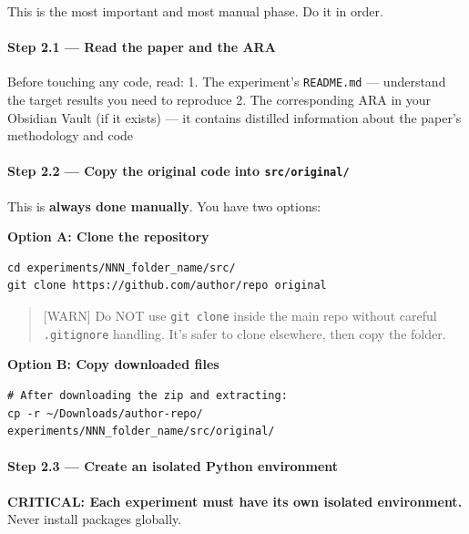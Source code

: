 This is the most important and most manual phase. Do it in order.

\paragraph{Step 2.1 --- Read the paper and the
ARA}\label{step-2.1-read-the-paper-and-the-ara}

Before touching any code, read: 1. The experiment's
\texttt{README.md} --- understand the target results
you need to reproduce 2. The corresponding ARA in your Obsidian Vault
(if it exists) --- it contains distilled information about the paper's
methodology and code

\paragraph{\texorpdfstring{Step 2.2 --- Copy the original code into
\texttt{src/original/}}{Step 2.2 --- Copy the original code into src/original/}}\label{step-2.2-copy-the-original-code-into-srcoriginal}

This is \textbf{always done manually}. You have two options:

\textbf{Option A: Clone the repository}

\begin{verbatim}
cd experiments/NNN_folder_name/src/
git clone https://github.com/author/repo original
\end{verbatim}

\begin{quote}
\small {[}WARN{]} Do NOT use \texttt{git clone} inside the
main repo without careful \texttt{.gitignore} handling.
It's safer to clone elsewhere, then copy the folder.
\end{quote}

\textbf{Option B: Copy downloaded files}

\begin{verbatim}
# After downloading the zip and extracting:
cp -r ~/Downloads/author-repo/ experiments/NNN_folder_name/src/original/
\end{verbatim}

\paragraph{Step 2.3 --- Create an isolated Python
environment}\label{step-2.3-create-an-isolated-python-environment}

\textbf{CRITICAL: Each experiment must have its own isolated
environment.} Never install packages globally.

